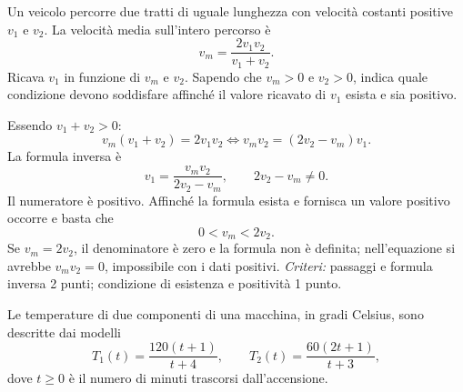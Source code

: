\documentclass[11pt,a4paper,addpoints]{exam}
\newcommand{\obiettivocorrente}{}
\newcommand{\obiettivo}[1]{%
  \gdef\obiettivocorrente{#1}%
}
\gdef\obiettivocorrente{}%
\newcounter{offsetfila}
\newenvironment{esercizi}
  {%
    \begin{questions}
    \setcounter{question}{\value{offsetfila}}%
  }
  {\end{questions}}
\newenvironment{esercizio}
  {%
    \par
    \ifprintanswers\else\begin{samepage}\fi
  }
  {%
    \ifprintanswers\else\end{samepage}\fi
    \par\vspace{3pt}
  }
\begin{document}
\begin{esercizi}
\begin{esercizio}
\end{esercizio}

\begin{esercizio}
\obiettivo{ricavare una formula inversa}
\question[3]
Un veicolo percorre due tratti di uguale lunghezza con velocità
costanti positive $v_1$ e $v_2$.
La velocità media sull'intero percorso è
\[
v_m=\frac{2v_1v_2}{v_1+v_2}.
\]
Ricava $v_1$ in funzione di $v_m$ e $v_2$.
Sapendo che $v_m>0$ e $v_2>0$, indica quale condizione
devono soddisfare affinché il valore ricavato di $v_1$
esista e sia positivo.
\begin{solution}
Essendo $v_1+v_2>0$:
\[
v_m(v_1+v_2)=2v_1v_2
\iff v_mv_2=(2v_2-v_m)v_1.
\]
La formula inversa è
\[
\boxed{v_1=\frac{v_mv_2}{2v_2-v_m}},
\qquad 2v_2-v_m\ne0.
\]
Il numeratore è positivo. Affinché la formula esista e
fornisca un valore positivo occorre e basta che
\[
\boxed{0<v_m<2v_2}.
\]
Se $v_m=2v_2$, il denominatore è zero e la formula non è definita;
nell'equazione si avrebbe $v_mv_2=0$, impossibile con i dati positivi.
\textit{Criteri:} passaggi e formula inversa 2 punti;
condizione di esistenza e positività 1 punto.
\end{solution}
\end{esercizio}

\begin{esercizio}
\obiettivo{interpretare e confrontare modelli frazionari}
\question
Le temperature di due componenti di una macchina, in gradi Celsius,
sono descritte dai modelli
\[
T_1(t)=\frac{120(t+1)}{t+4},
\qquad T_2(t)=\frac{60(2t+1)}{t+3},
\]
dove $t\ge0$ è il numero di minuti trascorsi dall'accensione.
\begin{parts}

\end{parts}
\end{esercizio}
\end{esercizi}
\end{document}
